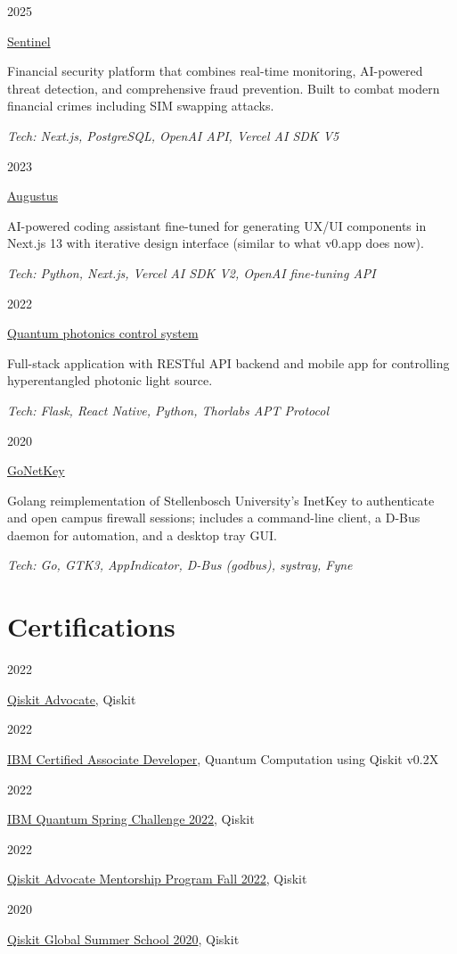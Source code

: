 \documentclass[9pt]{extreport}
\newcommand{\listitemspace}{0.25em}
\renewenvironment{itemize}
{\begin{list}{}{
    \setlength{\leftmargin}{0em}
    \setlength{\parskip}{0em}
    \setlength{\itemsep}{\listitemspace}
    \setlength{\parsep}{\listitemspace}}}
{\end{list}}
\newcommand{\entry}[2]{%
  \noindent%
  \begin{minipage}[t]{2.25cm}%
    \raggedright #1%
  \end{minipage}%
  \hspace{0.4cm}%
  \begin{minipage}[t]{\dimexpr\textwidth-2cm\relax}%
    #2%
  \end{minipage}%
  \vspace{0.25cm}%
}
\begin{document}
\entry{2025}{\href{https://github.com/ThamuMnyulwa/bet-hackathon-2025}{Sentinel}
\begin{itemize}
  \item Financial security platform that combines real-time monitoring, AI-powered threat detection, and comprehensive fraud prevention. Built to combat modern financial crimes including SIM swapping attacks.
  \item \textit{Tech: Next.js, PostgreSQL, OpenAI API, Vercel AI SDK V5}
\end{itemize}}

\entry{2023}{\href{https://github.com/Unathi-Skosana/augustus}{Augustus}
\begin{itemize}
    \item AI-powered coding assistant fine-tuned for generating UX/UI components in Next.js 13 with iterative design interface (similar to what v0.app does now).
    \item \textit{Tech: Python, Next.js, Vercel AI SDK V2, OpenAI fine-tuning API}
\end{itemize}}

\entry{2022}{\href{https://github.com/Unathi-Skosana/hyperentangled-photons-masters-experiment}{Quantum photonics control system}
\begin{itemize}
    \item Full-stack application with RESTful API backend and mobile app for controlling hyperentangled photonic light source.
    \item \textit{Tech: Flask, React Native, Python, Thorlabs APT Protocol}
\end{itemize}}
\entry{2020}{\href{https://github.com/Unathi-Skosana/gonetkey}{GoNetKey}
  \begin{itemize}
  \item Golang reimplementation of Stellenbosch University’s InetKey to authenticate and open campus firewall sessions; includes a command-line client, a D-Bus daemon for automation, and a desktop tray GUI. 
  \item \textit{Tech: Go, GTK3, AppIndicator, D-Bus (godbus), systray, Fyne}
\end{itemize}}

\section*{Certifications}

\entry{2022}{\href{https://www.credly.com/badges/1572414f-9c43-4bab-909b-be4abf516ae3/public_url}{Qiskit Advocate}, Qiskit}

\entry{2022}{\href{https://www.credly.com/badges/055e900b-ec8b-428c-b0aa-854695b17bef/public_url}{IBM Certified Associate Developer}, Quantum Computation using Qiskit v0.2X}

\entry{2022}{\href{https://www.credly.com/badges/ca639522-d9e4-412d-be79-95c3a0819c29/public_url}{IBM Quantum Spring Challenge 2022}, Qiskit}

\entry{2022}{\href{https://www.credly.com/badges/42753d82-8fcc-4f50-8068-c30cd510c286/public_url}{Qiskit Advocate Mentorship Program Fall 2022}, Qiskit}

\entry{2020}{\href{https://www.credly.com/badges/1572414f-9c43-4bab-909b-be4abf516ae3/public_url}{Qiskit Global Summer School 2020}, Qiskit}
\end{document}
